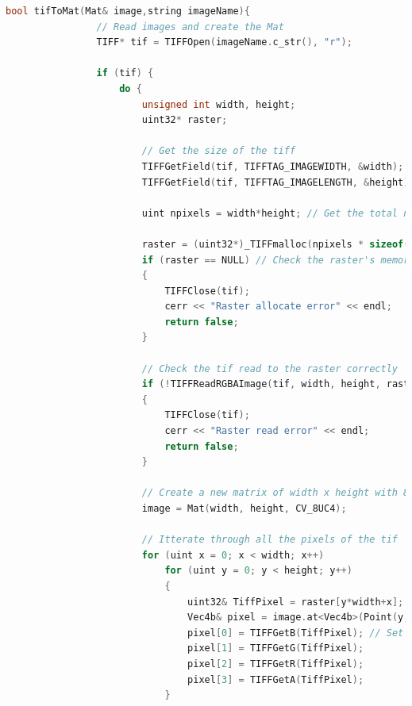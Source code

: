 \documentclass[a4paper,11pt]{article}
\begin{document}
    \begin{lstlisting}[language=C++]
            bool tifToMat(Mat& image,string imageName){
                // Read images and create the Mat
                TIFF* tif = TIFFOpen(imageName.c_str(), "r");
                
                if (tif) {
                    do {
                        unsigned int width, height;
                        uint32* raster;

                        // Get the size of the tiff
                        TIFFGetField(tif, TIFFTAG_IMAGEWIDTH, &width);
                        TIFFGetField(tif, TIFFTAG_IMAGELENGTH, &height);

                        uint npixels = width*height; // Get the total number of pixels

                        raster = (uint32*)_TIFFmalloc(npixels * sizeof(uint32)); // Allocate temp memory (bitmap)
                        if (raster == NULL) // Check the raster's memory was allocated
                        {
                            TIFFClose(tif);
                            cerr << "Raster allocate error" << endl;
                            return false;
                        }
                                
                        // Check the tif read to the raster correctly
                        if (!TIFFReadRGBAImage(tif, width, height, raster, 0))
                        {
                            TIFFClose(tif);
                            cerr << "Raster read error" << endl;
                            return false;
                        }

                        // Create a new matrix of width x height with 8 bits per channel and 4 channels (RGBA)
                        image = Mat(width, height, CV_8UC4); 
                                
                        // Itterate through all the pixels of the tif
                        for (uint x = 0; x < width; x++)
                            for (uint y = 0; y < height; y++)
                            {
                                uint32& TiffPixel = raster[y*width+x]; // Read the current pixel of the TIF
                                Vec4b& pixel = image.at<Vec4b>(Point(y, x)); // Read the current pixel of the matrix
                                pixel[0] = TIFFGetB(TiffPixel); // Set the pixel values as BGRA
                                pixel[1] = TIFFGetG(TiffPixel);
                                pixel[2] = TIFFGetR(TiffPixel);
                                pixel[3] = TIFFGetA(TiffPixel);
                            }
                        

\end{lstlisting}
\end{document}
